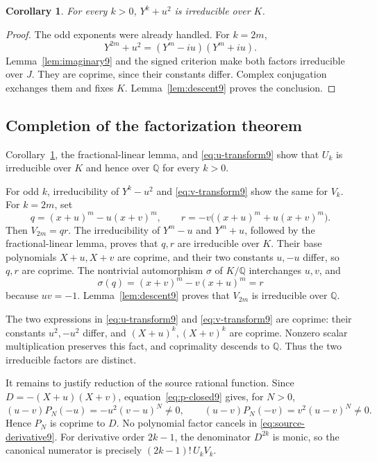\documentclass[11pt]{article}
\newtheorem{corollary}[theorem]{Corollary}
\newcommand{\Q}{\mathbb Q}
\begin{document}
\begin{corollary}\label{cor:plus9}
For every $k>0$, $Y^k+u^2$ is irreducible over $K$.
\end{corollary}

\begin{proof}
The odd exponents were already handled. For $k=2m$,
\[
 Y^{2m}+u^2=(Y^m-iu)(Y^m+iu).
\]
Lemma~\ref{lem:imaginary9} and the signed criterion make both factors
irreducible over $J$. They are coprime, since their constants differ.
Complex conjugation exchanges them and fixes $K$.
Lemma~\ref{lem:descent9} proves the conclusion.
\end{proof}

\subsection{Completion of the factorization theorem}

Corollary~\ref{cor:plus9}, the fractional-linear lemma, and
\eqref{eq:u-transform9} show that $U_k$ is irreducible over $K$ and
hence over $\Q$ for every $k>0$.

For odd $k$, irreducibility of $Y^k-u^2$ and
\eqref{eq:v-transform9} show the same for $V_k$. For $k=2m$, set
\[
 q=(x+u)^m-u(x+v)^m,\qquad
 r=-v\big((x+u)^m+u(x+v)^m\big).
\]
Then $V_{2m}=qr$. The irreducibility of $Y^m-u$ and $Y^m+u$,
followed by the fractional-linear lemma, proves that $q,r$ are
irreducible over $K$. Their base polynomials $X+u,X+v$ are coprime,
and their two constants $u,-u$ differ, so $q,r$ are coprime.
The nontrivial automorphism $\sigma$ of $K/\Q$ interchanges $u,v$, and
\[
 \sigma(q)=(x+v)^m-v(x+u)^m=r
\]
because $uv=-1$. Lemma~\ref{lem:descent9} proves that $V_{2m}$ is
irreducible over $\Q$.

The two expressions in \eqref{eq:u-transform9} and
\eqref{eq:v-transform9} are coprime: their constants $u^2,-u^2$ differ,
and $(X+u)^k,(X+v)^k$ are coprime. Nonzero scalar multiplication
preserves this fact, and coprimality descends to $\Q$.
Thus the two irreducible factors are distinct.

It remains to justify reduction of the source rational function.
Since $D=-(X+u)(X+v)$, equation~\eqref{eq:p-closed9} gives, for $N>0$,
\[
 (u-v)P_N(-u)=-u^2(v-u)^N\ne0,\qquad
 (u-v)P_N(-v)=v^2(u-v)^N\ne0.
\]
Hence $P_N$ is coprime to $D$. No polynomial factor cancels in
\eqref{eq:source-derivative9}. For derivative order $2k-1$, the
denominator $D^{2k}$ is monic, so the canonical numerator is precisely
$(2k-1)!\,U_kV_k$.
\end{document}
